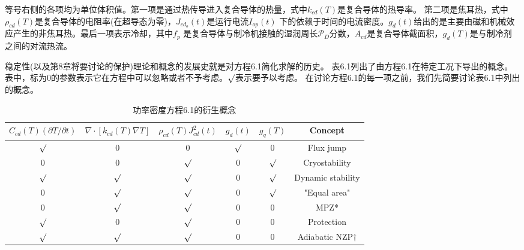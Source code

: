 等号右侧的各项均为单位体积值。第一项是通过热传导进入复合导体的热量，式中$k_{cd}(T)$是复合导体的热导率。
第二项是焦耳热，式中$\rho_{cd}(T)$是复合导体的电阻率(在超导态为零)，$J_{cd_o}(t)$是运行电流$I_{op}(t)$
下的依赖于时间的电流密度。$g_d(t)$给出的是主要由磁和机械效应产生的非焦耳热。最后一项表示冷却，其中$f_p$
是复合导体与制冷机接触的湿润周长$\mathcal{P}_D$分数，$A_{cd}$是复合导体截面积，$g_d(T)$是与制冷剂
之间的对流热流。

稳定性(以及第8章将要讨论的保护)理论和概念的发展史就是对方程6.1简化求解的历史。
表6.1列出了由方程6.1在特定工况下导出的概念。
表中，标为0的参数表示它在方程中可以忽略或者不予考虑。$\surd$表示要予以考虑。
在讨论方程6.1的每一项之前，我们先简要讨论表6.1中列出的概念。

\begin{table}[htbp]\small
\centering
\caption{功率密度方程6.1的衍生概念} 
\begin{tabular}{|c|c|c|c|c|c|}
\hline
$C_{cd}(T)(\partial T/\partial t)$&$\nabla\cdot[k_{cd}(T)\nabla T]   $&$\rho_{cd}(T)J_{cd}^2(t) $  &  $g_d(t)$ & $g_q(T) $ &    Concept           \\ \hline
$\surd $& 0 & 0 & $\surd $& 0 & Flux jump     \\ \hline
0 & 0 & $\surd $ & 0 & $\surd $ & Cryostability \\ \hline
$\surd $ & $\surd $ & $\surd $ & 0 & $\surd $ & Dynamic stability      \\ \hline
0 & $\surd $ & $\surd $ & 0 & $\surd $ & "Equal area"        \\ \hline
0 & $\surd $ & $\surd $& 0 & 0 & MPZ*          \\ \hline
$\surd $ & 0 &$\surd $ & 0 & 0 & Protection    \\ \hline
$\surd $ & $\surd $ &$\surd $ & 0 & 0 & Adiabatic NZP$\dagger$ \\ \hline
\end{tabular}
\end{table}

